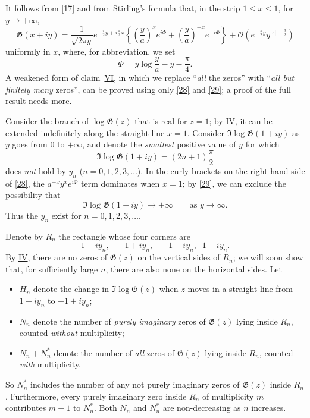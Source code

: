 \documentclass{article}
\theoremstyle{plain}
\newcommand{\GG}{\mathfrak{G}}
\newcommand{\error}{\mathcal{O}}
\renewcommand{\leq}{\leqslant}
\newcommand{\oldpage}[1]{\marginpar{\footnotesize$\Big\vert$ \textit{p.~#1}}}
\begin{document}
\begin{enumerate}[I.]
    It follows from \cref{17} and from Stirling's formula that, in the strip $1\leq x\leq 1$, for $y\to+\infty$,
    \[
    \label{28}
      \GG(x+iy)
      =
      \frac{1}{\sqrt{2\pi y}} e^{-\frac\pi2 y+ i\frac\pi2 x}
      \left\{
        \left(\frac{y}{a}\right)^x e^{i\Phi} + 
        \left(\frac{y}{a}\right)^{-x} e^{-i\Phi}
      \right\} + \error\left(
        e^{-\frac\pi2 y} y^{|z| - \frac32}
      \right)
    \tag{28}
    \]
    uniformly in $x$, where, for abbreviation, we set
    \[
    \label{29}
      \Phi = y\log\frac{y}{a} - y - \frac\pi4.
    \tag{29}
    \]
    A weakened form of claim~\hyperref[VI]{VI}, in which we replace ``\emph{all} the zeros'' with ``\emph{all but finitely many} zeros'', can be proved using only \cref{28} and \cref{29}; a proof of the full result needs more.

    Consider the branch of $\log\GG(z)$ that is real for $z=1$;
    by \hyperref[IV]{IV}, it can be extended indefinitely along the straight line $x=1$.
    Consider $\Im\log\GG(1+iy)$ as $y$ goes from $0$ to $+\infty$, and denote the \emph{smallest} positive value of $y$ for which
    \[
      \Im\log\GG(1+iy) = (2n+1)\frac\pi2
    \]
    does \emph{not} hold by $y_n$ ($n=0,1,2,3,\ldots$).
    In the curly brackets on the right-hand side of \cref{28}, the $a^{-x}y^xe^{i\Phi}$ term dominates when $x=1$;
    by \cref{29}, we can exclude the possibility that
    \[
      \Im\log\GG(1+iy) \to +\infty
      \qquad\mbox{as $y\to\infty$}.
    \]
    Thus the $y_n$ exist for $n=0,1,2,3,\ldots$.

    Denote by $R_n$ the rectangle whose four corners are
    \[
      1+iy_n, \;\; -1+iy_n, \;\; -1-iy_n, \;\; 1-iy_n.
    \]
    By \hyperref[IV]{IV}, there are no zeros of $\GG(z)$ on the vertical sides of $R_n$;
    we will soon show that, for sufficiently large $n$, there are also none on the horizontal sides.
    Let
    \begin{itemize}
      \item $H_n$ denote the change in $\Im\log\GG(z)$ when $z$ moves in a straight line from $1+iy_n$ to $-1+iy_n$;
      \item $N_n$ denote the number of \emph{purely imaginary} zeros of $\GG(z)$ lying inside $R_n$, counted \emph{without} multiplicity;
\oldpage{314}
      \item $N_n+N_n^*$ denote the number of \emph{all} zeros of $\GG(z)$ lying inside $R_n$, counted \emph{with} multiplicity.
    \end{itemize}

    So $N_n^*$ includes the number of any not purely imaginary zeros of $\GG(z)$ inside $R_n$.
    Furthermore, every purely imaginary zero inside $R_n$ of multiplicity $m$ contributes $m-1$ to $N_n^*$.
    Both $N_n$ and $N_n^*$ are non-decreasing as $n$ increases.


\end{enumerate}
\end{document}
